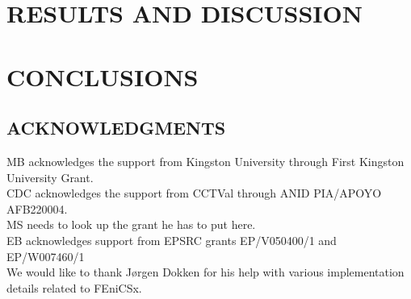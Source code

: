 \documentclass[12pt]{article}
\begin{document}
\section*{\sffamily \Large RESULTS AND DISCUSSION}


 








\section*{\sffamily \Large CONCLUSIONS}




\subsection*{\sffamily \large ACKNOWLEDGMENTS}
MB acknowledges the support from Kingston University through First Kingston University Grant. \\
CDC acknowledges the support from CCTVal through ANID PIA/APOYO AFB220004.\\
MS needs to look up the grant he has to put here. \\
EB acknowledges support from EPSRC grants EP/V050400/1 and EP/W007460/1 \\
We would like to thank J{\o}rgen Dokken for his help with various implementation details related to FEniCSx.
\end{document}
